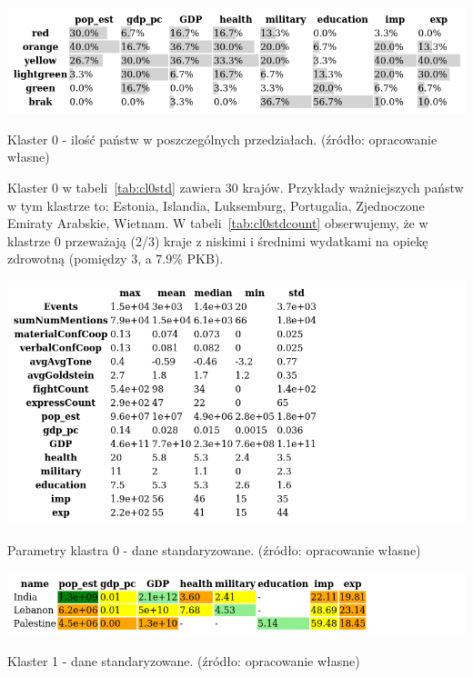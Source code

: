 \documentclass[11pt]{report}
\begin{document}
    \begin{table}[!htp]
        \centering
        \includegraphics[width=\linewidth]{tables/CLUST/cluster0stdkmeanscount.png}
        \caption{Klaster 0 - ilość państw w poszczególnych przedziałach. (źródło: opracowanie własne)}
        \label{tab:cl0stdcount}
    \end{table}

    Klaster 0 w tabeli~\ref{tab:cl0std} zawiera 30 krajów.
    Przykłady ważniejszych państw w tym klastrze to: Estonia, Islandia, Luksemburg, Portugalia, Zjednoczone Emiraty Arabskie, Wietnam.
    W tabeli~\ref{tab:cl0stdcount} obserwujemy, że w klastrze 0 przeważają (2/3) kraje z niskimi i średnimi wydatkami na opiekę zdrowotną (pomiędzy 3, a 7.9\% PKB).

    \begin{table}[!htp]
        \centering
        \includegraphics[width=\linewidth]{tables/CLUST/desc/clust0std_desc.png}
        \caption{Parametry klastra 0 - dane standaryzowane. (źródło: opracowanie własne)}
        \label{tab:cl0std_desc}
    \end{table}

    \begin{table}[!htp]
        \centering
        \includegraphics[width=\linewidth]{tables/CLUST/cluster1stdkmeans.png}
        \caption{Klaster 1 - dane standaryzowane. (źródło: opracowanie własne)}
        \label{tab:cl1std}
    \end{table}
\end{document}
